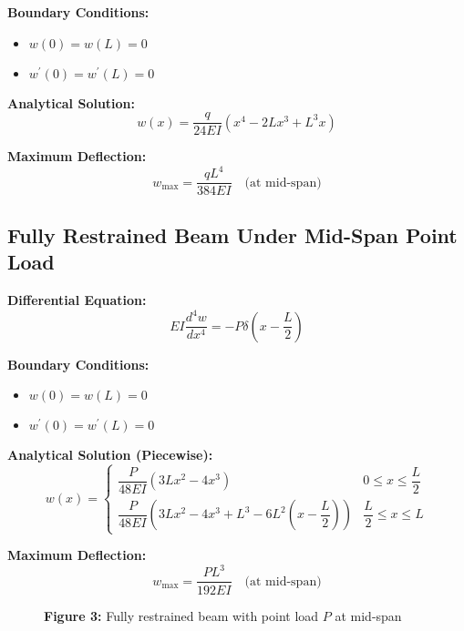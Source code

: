 \documentclass[12pt]{article}
\begin{document}
\textbf{Boundary Conditions:}
\begin{itemize}
    \item $w(0) = w(L) = 0$
    \item $w^{\prime}(0) = w^{\prime}(L) = 0$
\end{itemize}

\textbf{Analytical Solution:}
\begin{equation}\tag{5}
w(x) = \frac{q}{24EI}\left(x^{4} - 2Lx^{3} + L^{3}x\right)
\end{equation}

\textbf{Maximum Deflection:}
\begin{equation}\tag{6}
w_{\max} = \frac{qL^{4}}{384EI} \quad \text{(at mid-span)}
\end{equation}

\subsection{Fully Restrained Beam Under Mid-Span Point Load}

\textbf{Differential Equation:}
\begin{equation}\tag{7}
EI\frac{d^{4}w}{dx^{4}} = -P\delta\left(x - \frac{L}{2}\right)
\end{equation}

\textbf{Boundary Conditions:}
\begin{itemize}
    \item $w(0) = w(L) = 0$
    \item $w^{\prime}(0) = w^{\prime}(L) = 0$
\end{itemize}

\textbf{Analytical Solution (Piecewise):}
\begin{equation}\tag{8}
w(x) = 
\begin{cases}
\dfrac{P}{48EI}\left(3Lx^{2} - 4x^{3}\right) & 0 \leq x \leq \dfrac{L}{2} \\[2ex]
\dfrac{P}{48EI}\left(3Lx^{2} - 4x^{3} + L^{3} - 6L^{2}\left(x - \dfrac{L}{2}\right)\right) & \dfrac{L}{2} \leq x \leq L
\end{cases}
\end{equation}

\textbf{Maximum Deflection:}
\begin{equation}\tag{9}
w_{\max} = \frac{PL^{3}}{192EI} \quad \text{(at mid-span)}
\end{equation}

\begin{figure}[h]
\centering
\textbf{Figure 3:} Fully restrained beam with point load $P$ at mid-span
\end{figure}
\end{document}
